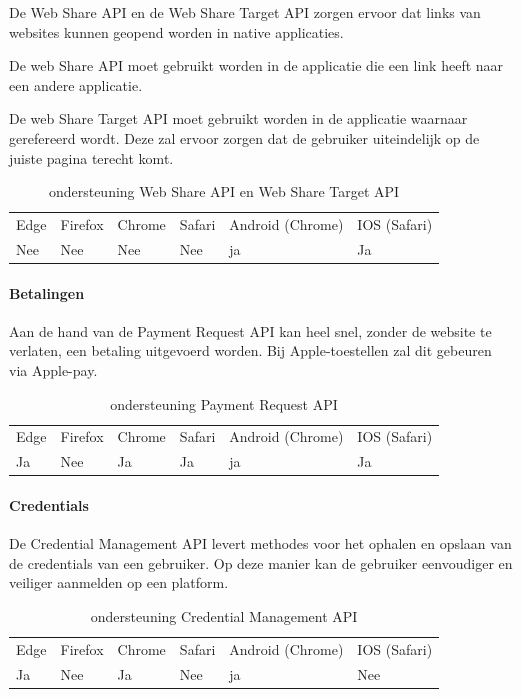 De Web Share API \autocite{Giuca2020} en de Web Share Target API \autocite{Williger2020} zorgen ervoor dat links van websites kunnen geopend worden in native applicaties. 

De web Share API moet gebruikt worden in de applicatie die een link heeft naar een andere applicatie.

De web Share Target API moet gebruikt worden in de applicatie waarnaar gerefereerd wordt. Deze zal ervoor zorgen dat de gebruiker uiteindelijk op de juiste pagina terecht komt.

\begin{table}[H]
	\centering
	\begin{tabular}{llllll}
		Edge & Firefox & Chrome & Safari & Android (Chrome) & IOS (Safari) \\
		Nee   & Nee      &  Nee     & Nee     & ja               & Ja          
	\end{tabular}	
	\caption{ondersteuning Web Share API en Web Share Target API}
\end{table}



\paragraph{Betalingen}
Aan de hand van de Payment Request API \autocite{Denicola2020} kan heel snel, zonder de website te verlaten, een betaling uitgevoerd worden. Bij Apple-toestellen zal dit gebeuren via Apple-pay. 

\begin{table}[H]
	\centering
	\begin{tabular}{llllll}
		Edge & Firefox & Chrome & Safari & Android (Chrome) & IOS (Safari) \\
		Ja   & Nee      &  Ja     & Ja     & ja               & Ja          
	\end{tabular}	
	\caption{ondersteuning Payment Request API}
\end{table}


\paragraph{Credentials}
De Credential Management API \autocite{West2020} levert methodes voor het ophalen en opslaan van de credentials van een gebruiker. Op deze manier kan de gebruiker eenvoudiger en veiliger aanmelden op een platform.

\begin{table}[H]
	\begin{tabular}{llllll}
		Edge & Firefox & Chrome & Safari & Android (Chrome) & IOS (Safari) \\
		Ja   & Nee      &  Ja     & Nee     & ja               & Nee          
	\end{tabular}	
	\caption{ondersteuning Credential Management API}
\end{table}

